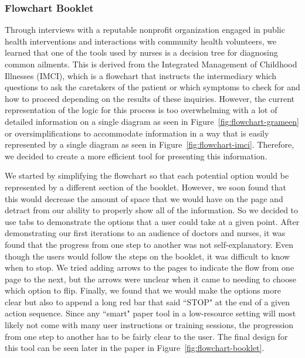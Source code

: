 \documentclass{sig-alternate}
\begin{document}
\subsubsection{Flowchart Booklet}
Through interviews with a reputable nonprofit organization engaged in public health interventions and interactions with community health volunteers, we learned that one of the tools used by nurses is a decision tree for diagnosing common ailments. This is derived from the Integrated Management of Childhood Illnesses (IMCI), which is a flowchart that instructs the intermediary which questions to ask the caretakers of the patient or which symptoms to check for and how to proceed depending on the results of these inquiries. However, the current representation of the logic for this process is too overwhelming with a lot of detailed information on a single diagram as seen in Figure~\ref{fig:flowchart-grameen} or oversimplifications to accommodate information in a way that is easily represented by a single diagram as seen in Figure~\ref{fig:flowchart-imci}. Therefore, we decided to create a more efficient tool for presenting this information.

We started by simplifying the flowchart so that each potential option would be represented by a different section of the booklet. However, we soon found that this would decrease the amount of space that we would have on the page and detract from our ability to properly show all of the information. So we decided to use tabs to demonstrate the options that a user could take at a given point. After demonstrating our first iterations to an audience of doctors and nurses, it was found that the progress from one step to another was not self-explanatory. Even though the users would follow the steps on the booklet, it was difficult to know when to stop. We tried adding arrows to the pages to indicate the flow from one page to the next, but the arrows were unclear when it came to needing to choose which option to flip. Finally, we found that we would make the options more clear but also to append a long red bar that said ``STOP" at the end of a given action sequence. Since any ``smart" paper tool in a low-resource setting will most likely not come with many user instructions or training sessions, the progression from one step to another has to be fairly clear to the user. The final design for this tool can be seen later in the paper in Figure~\ref{fig:flowchart-booklet}.
\end{document}
